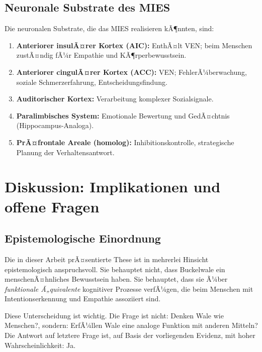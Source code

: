 ﻿\documentclass[12pt,a4paper]{article}
\theoremstyle{definition}
\theoremstyle{remark}
\begin{document}
\subsection{Neuronale Substrate des MIES}

Die neuronalen Substrate, die das MIES realisieren kÃ¶nnten, sind:

\begin{enumerate}
  \item \textbf{Anteriorer insulÃ¤rer Kortex (AIC):} EnthÃ¤lt VEN; beim Menschen
        zustÃ¤ndig fÃ¼r Empathie und KÃ¶rperbewusstsein.
  \item \textbf{Anteriorer cingulÃ¤rer Kortex (ACC):} VEN; FehlerÃ¼berwachung,
        soziale Schmerzerfahrung, Entscheidungsfindung.
  \item \textbf{Auditorischer Kortex:} Verarbeitung komplexer Sozialsignale.
  \item \textbf{Paralimbisches System:} Emotionale Bewertung und GedÃ¤chtnis
        (Hippocampus-Analoga).
  \item \textbf{PrÃ¤frontale Areale (homolog):} Inhibitionskontrolle,
        strategische Planung der Verhaltensantwort.
\end{enumerate}

\section{Diskussion: Implikationen und offene Fragen}
\label{sec:diskussion}

\subsection{Epistemologische Einordnung}

Die in dieser Arbeit prÃ¤sentierte These ist in mehrerlei Hinsicht epistemologisch
anspruchsvoll. Sie behauptet nicht, dass Buckelwale ein menschenÃ¤hnliches
Bewusstsein haben. Sie behauptet, dass sie Ã¼ber \emph{funktionale Ã„quivalente}
kognitiver Prozesse verfÃ¼gen, die beim Menschen mit Intentionserkennung und
Empathie assoziiert sind.

Diese Unterscheidung ist wichtig. Die Frage ist nicht: Denken Wale wie
Menschen?, sondern: ErfÃ¼llen Wale eine analoge Funktion mit anderen
Mitteln? Die Antwort auf letztere Frage ist, auf Basis der vorliegenden Evidenz,
mit hoher Wahrscheinlichkeit: Ja.
\end{document}
